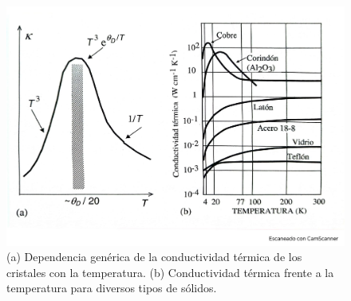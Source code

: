 \begin{figure}[h!] \centering
    \includegraphics[scale=0.35]{Cuerpo/Ch_05/Fotos libro 9.pdf}
    \caption{(a) Dependencia genérica de la conductividad térmica de los cristales con la temperatura. (b) Conductividad térmica frente a la temperatura para diversos tipos de sólidos.}
    \label{Fig:05-09}
\end{figure}    



